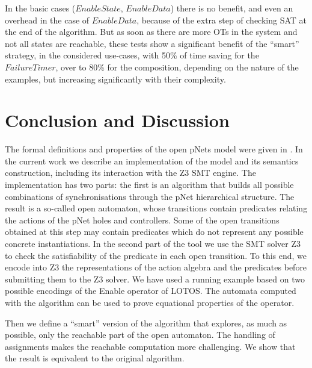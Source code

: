 \documentclass[smallcondensed]{svjour3}
\begin{document}
        \medskip
        In the basic cases ($EnableState$, $EnableData$) there is no
        benefit, and even an overhead in the case of $EnableData$,
        because of the extra step of checking SAT at the end of the
        algorithm.
But as soon as there are more OTs in the system and not all
states are reachable, these tests show a significant benefit of the ``smart'' strategy, in
the considered use-cases, with 50\% of time saving for the $FailureTimer$,
over to 80\% for the composition, depending
        on the nature of the examples, but increasing significantly
        with their complexity.

\section{Conclusion and Discussion}
\label{section:conclusion}

The formal definitions and properties of the open pNets model were
given in \cite{henrio:Forte2016}. In the current work we describe an implementation of
the model and its semantics construction, including its interaction
with the Z3 SMT engine.
The implementation has two parts: the first is an algorithm
that builds all possible combinations of synchronisations through the
pNet hierarchical structure. The result is a so-called
open automaton, whose transitions contain predicates relating
the actions of the pNet holes and controllers. Some of the open
transitions obtained at this step  may
contain predicates which do not represent any possible concrete
instantiations. 
In the second part of the tool we use the SMT solver Z3 to check the
satisfiability of the predicate in each open transition. 
To this end, we encode into Z3 the representations of the action algebra and
the predicates before submitting them to the
Z3 solver. 
%
%
We have used a running example based on two possible
encodings of the Enable operator of LOTOS. The automata computed with
the algorithm can be used to prove equational properties of the
operator.

Then we define a ``smart'' version of the algorithm that explores, as
much as possible, only the reachable part of the open automaton. The
handling of assignments makes the reachable computation more
challenging. We show that the result is equivalent to the original
algorithm. 
\end{document}
